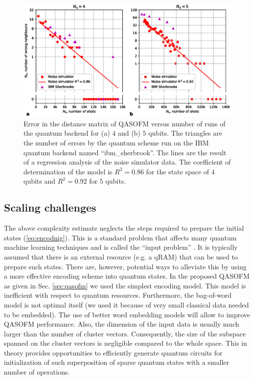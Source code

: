 \documentclass[pra,showkeys,twocolumn,showpacs,aps,10pt]{revtex4-2}
\begin{document}
\begin{figure}[t]
  \includegraphics[width=1.85\columnwidth]{tomography-errors-by-shots-n4-n5.eps}
  \caption{Error in the distance matrix of QASOFM versus number of runs of the quantum backend for (a) $4$ and (b) $5$ qubits. The triangles are the number of errors by the quantum scheme run on the IBM quantum backend named ``ibm\_sherbrook''.  The lines are the result of a regression analysis of the noise simulator data.  The coefficient of determination of the model is $R^2 = 0.86$ for the state space of $4$ qubits and $R^2 = 0.92$ for $5$ qubits.
  }   \label{fig:tomography-errors-by-shots-n4}
\end{figure}





\subsection{Scaling challenges}

The above complexity estimate neglects the steps required to prepare the initial states (\ref{eq:encodnig}).  This is a standard problem that affects many quantum machine learning techniques and is called the ``input problem'' \cite{biamonte2017}.  It is typically assumed that there is an external resource (e.g. a qRAM) that can be used to prepare such states.  There are, however, potential ways to alleviate this by using a more effective encoding scheme into quantum states.  In the proposed QASOFM as given in Sec. \ref{sec:qasofm} we used the simplest encoding model. This model is inefficient with respect to quantum resources. Furthermore, the bag-of-word model is not optimal itself (we used it because of very small classical data needed to be embedded). The use of better word embedding models will allow to improve QASOFM performance. Also, the dimension of the input data is usually much larger than the number of cluster vectors. Consequently, the size of the subspace spanned on the cluster vectors is negligible compared to the whole space. This in theory provides opportunities to efficiently generate quantum circuits for initialization of such superposition of sparse quantum states with a smaller number of operations.
\end{document}
